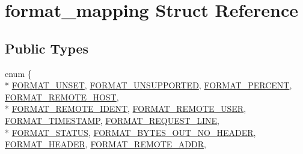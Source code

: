 \hypertarget{structformat__mapping}{\section{format\-\_\-mapping Struct Reference}
\label{structformat__mapping}
}
\subsection*{Public Types}
\begin{DoxyCompactItemize}
\item 
enum \{ \\*
\hyperlink{structformat__mapping_a64140d7a8e9af45156f6c4e81dabb506a807928724f7d1a4c8b255ac3afc0b4fc}{F\-O\-R\-M\-A\-T\-\_\-\-U\-N\-S\-E\-T}, 
\hyperlink{structformat__mapping_a64140d7a8e9af45156f6c4e81dabb506a0ca0ad05ee6d90d393e99114e4bd6013}{F\-O\-R\-M\-A\-T\-\_\-\-U\-N\-S\-U\-P\-P\-O\-R\-T\-E\-D}, 
\hyperlink{structformat__mapping_a64140d7a8e9af45156f6c4e81dabb506a4aa6180d6e2aa5a6f319d79d49596849}{F\-O\-R\-M\-A\-T\-\_\-\-P\-E\-R\-C\-E\-N\-T}, 
\hyperlink{structformat__mapping_a64140d7a8e9af45156f6c4e81dabb506a286dd5cb6f558aa665d5a5fdd4016422}{F\-O\-R\-M\-A\-T\-\_\-\-R\-E\-M\-O\-T\-E\-\_\-\-H\-O\-S\-T}, 
\\*
\hyperlink{structformat__mapping_a64140d7a8e9af45156f6c4e81dabb506a57a2dade82b1776af1f0043c2ec5ad1b}{F\-O\-R\-M\-A\-T\-\_\-\-R\-E\-M\-O\-T\-E\-\_\-\-I\-D\-E\-N\-T}, 
\hyperlink{structformat__mapping_a64140d7a8e9af45156f6c4e81dabb506a363599fc119cb9361466df5ea675fa5e}{F\-O\-R\-M\-A\-T\-\_\-\-R\-E\-M\-O\-T\-E\-\_\-\-U\-S\-E\-R}, 
\hyperlink{structformat__mapping_a64140d7a8e9af45156f6c4e81dabb506a3158f6c5b72451e6130aae9536eaa644}{F\-O\-R\-M\-A\-T\-\_\-\-T\-I\-M\-E\-S\-T\-A\-M\-P}, 
\hyperlink{structformat__mapping_a64140d7a8e9af45156f6c4e81dabb506a7e9d40606d4e4ad432dc2555f9eaf7a1}{F\-O\-R\-M\-A\-T\-\_\-\-R\-E\-Q\-U\-E\-S\-T\-\_\-\-L\-I\-N\-E}, 
\\*
\hyperlink{structformat__mapping_a64140d7a8e9af45156f6c4e81dabb506a23e3f2882e3af8762ee69acdfaa5804b}{F\-O\-R\-M\-A\-T\-\_\-\-S\-T\-A\-T\-U\-S}, 
\hyperlink{structformat__mapping_a64140d7a8e9af45156f6c4e81dabb506a7a3c19b50b2f0c9b68338362ab07f8a9}{F\-O\-R\-M\-A\-T\-\_\-\-B\-Y\-T\-E\-S\-\_\-\-O\-U\-T\-\_\-\-N\-O\-\_\-\-H\-E\-A\-D\-E\-R}, 
\hyperlink{structformat__mapping_a64140d7a8e9af45156f6c4e81dabb506ad5ce7e53ef10ac6348c822d661ab3099}{F\-O\-R\-M\-A\-T\-\_\-\-H\-E\-A\-D\-E\-R}, 
\hyperlink{structformat__mapping_a64140d7a8e9af45156f6c4e81dabb506a810a24c0d809e54295c239352e5c27e4}{F\-O\-R\-M\-A\-T\-\_\-\-R\-E\-M\-O\-T\-E\-\_\-\-A\-D\-D\-R}, 

\end{DoxyCompactItemize}
